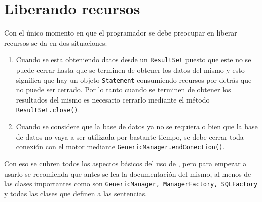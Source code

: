 \section{Liberando recursos}
Con \jj el único momento en que el programador se debe preocupar en liberar recursos se da en dos situaciones:
\begin{enumerate}
\item Cuando se esta obteniendo datos desde un \verb=ResultSet= puesto que este no se puede cerrar hasta que se terminen de obtener los datos del mismo y esto significa que hay un objeto \verb=Statement= consumiendo recursos por detrás que no puede ser cerrado. Por lo tanto cuando se terminen de obtener los resultados del mismo es necesario cerrarlo mediante el método \verb=ResultSet.close()=.
\item Cuando se considere que la base de datos ya no se requiera o bien que la base de datos no vaya a ser utilizada por bastante tiempo, se debe cerrar toda conexión con el motor mediante \verb=GenericManager.endConection()=.
\end{enumerate}

Con eso se cubren todos los aspectos básicos del uso de \jj, pero para empezar a usarlo se recomienda que antes se lea la documentación del mismo, al menos de las clases importantes como son \verb=GenericManager, ManagerFactory, SQLFactory= y todas las clases que definen a las sentencias.